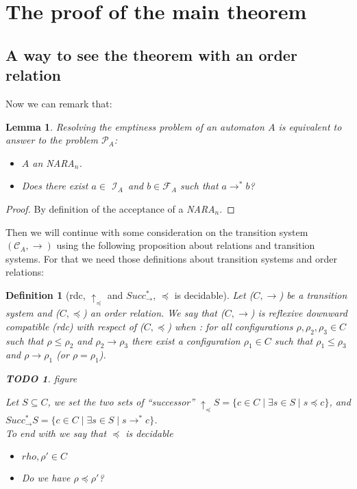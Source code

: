 \documentclass[a4paper,10pt]{report}
\newtheorem{lm}{Lemma}
\newtheorem{df}{Definition}
\newtheorem{td}{TODO}
\theoremstyle{remark}
\newcommand{\C}{\mathcal{C}_{A}}
\newcommand{\I}{\mathcal{I}_{A}}
\newcommand{\F}{\mathcal{F}_{A}}
\newcommand{\pb}{$\mathcal{P}_{A}$}
\begin{document}
\section{The proof of the main theorem}

\subsection{A way to see the theorem with an order relation}

Now we can remark that:
\begin{lm}
  \label{lmtth}
  Resolving the emptiness problem of an automaton $A$ is equivalent to answer to the problem \pb:
 \begin{itemize}
     \item[Input:] $A$ an \textit{NARA}$_n$.
     \item[Question:] Does there exist $a \in$ $\I$\ and $b \in\F$ such that $ a \rightarrow^* b $?
    \end{itemize} 
\end{lm}
\begin{proof} 
  By definition of the acceptance of a \textit{NARA}$_n$. 
\end{proof}

Then we will continue with some consideration on the transition system $(\C,\rightarrow)$ using the following proposition about relations and transition systems.
For that we need those definitions about transition systems and order relations:

\begin{df}[rdc, $\uparrow_\preceq$ and $ Succ^*_\rightarrow$, $\preceq$ is decidable]
  Let ($C,\rightarrow$) be a transition system and ($C,\preceq$) an order relation.
  We say that ($C,\rightarrow$) is reflexive downward compatible (rdc) with respect of ($C,\preceq$) when :
 for all configurations $\rho,\rho_2,\rho_3 \in C$ such that  $\rho \leq \rho_2$ and $ \rho_2 \rightarrow \rho_3$ 
 there exist a configuration $\rho_1 \in C$ such that  $\rho_1 \leq \rho_3$ and $\rho \rightarrow \rho_1 $ (or $\rho = \rho_1$). 
 \begin{td}
  figure
 \end{td}
  Let $S \subseteq C$,
  we set the two sets of ``successor''  $\uparrow_\preceq S = \{c \in C \mid \exists s \in S \mid s \preceq c \}$, and $Succ^*_\rightarrow S = \{c \in C \mid \exists s \in S \mid s \rightarrow^* c \}$.\\
  To end with we say that $\preceq$ is decidable
   \begin{itemize}
     \item[Input:] $rho,\rho' \in C$ 
     \item[Question:] Do we have $\rho \preceq \rho'$?
    \end{itemize} 
\end{df}
\end{document}
